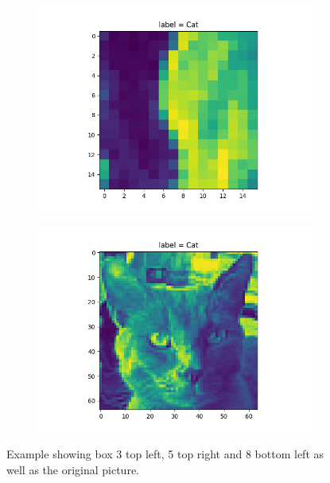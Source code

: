 \documentclass{article}
\begin{document}
\begin{figure}[H]
\begin{subfigure}{.5\textwidth}
  \centering
  \includegraphics[width=1\linewidth]{2b/box num 8.png}  
  
  \label{fig:sub-first}
\end{subfigure}
\begin{subfigure}{.5\textwidth}
  \centering
  \includegraphics[width=1\linewidth]{2b/example pic.png}  
  
  \label{fig:sub-first}
\end{subfigure}

\caption{Example showing box 3 top left, 5 top right and 8 bottom left as well as the original picture.}
\label{BOXES}
\end{figure}
\end{document}
